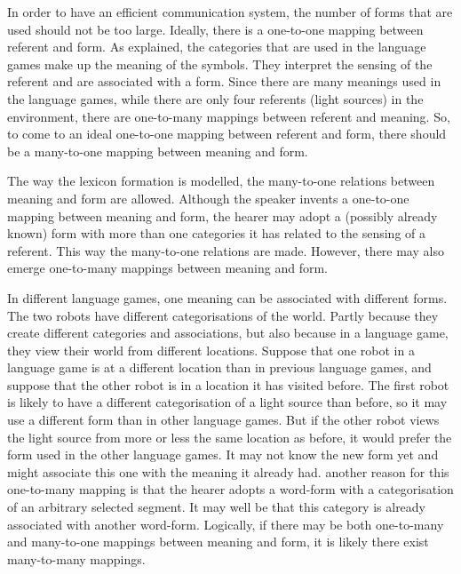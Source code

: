 In order to have an efficient communication system, the number of forms that are used should not be too large. Ideally, there is a one-to-one mapping between referent and form. As explained, the categories that are used in the language games make up the meaning of the symbols. They interpret the sensing of the referent and are associated with a form. Since there are many meanings used in the language games, while there are only four referents (light sources) in the environment, there are one-to-many mappings between referent and meaning. So, to come to an ideal one-to-one mapping between referent and form, there should be a many-to-one mapping between meaning and form.

The way the lexicon formation is modelled, the many-to-one relations between meaning and form are allowed. Although the speaker invents a one-to-one mapping between meaning and form, the hearer may adopt a (possibly already known) form with more than one categories it has related to the sensing of a referent. This way the many-to-one relations are made. However, there may also emerge one-to-many mappings between meaning and form. 

In different language games, one meaning can be associated with different forms. The two robots have different categorisations of the world. Partly because they create different categories and associations, but also because in a language game, they view their world from different locations. Suppose that one robot in a language game is at a different location than in previous language games, and suppose that the other robot is in a location it has visited before. The first robot is likely to have a different categorisation of a light source than before, so it may use a different form than in other language games. But if the other robot views the light source from more or less the same location as before, it would prefer the form used in the other language games. It may not know the new form yet and might associate this one with the meaning it already had. another reason for this one-to-many mapping is that the hearer adopts a word-form with a categorisation of an arbitrary selected segment. It may well be that this category is already associated with another word-form. Logically, if there may be both one-to-many and many-to-one mappings between meaning and form, it is likely there exist many-to-many mappings.

